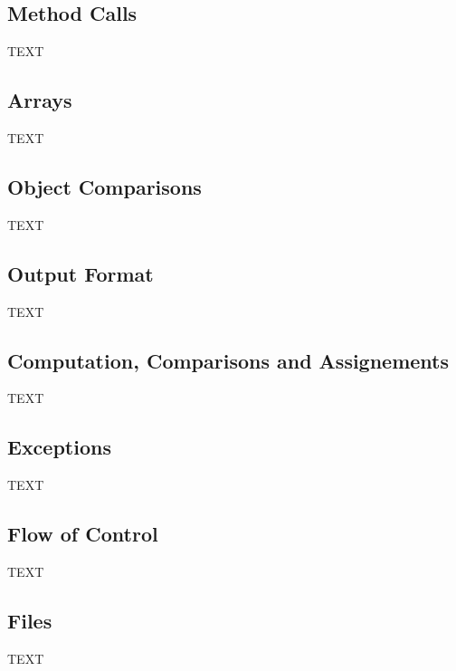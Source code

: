 \subsection{Method Calls}
TEXT

\subsection{Arrays}
TEXT

\subsection{Object Comparisons}
TEXT

\subsection{Output Format}
TEXT

\subsection{Computation, Comparisons and Assignements}
TEXT

\subsection{Exceptions}
TEXT

\subsection{Flow of Control}
TEXT

\subsection{Files}
TEXT